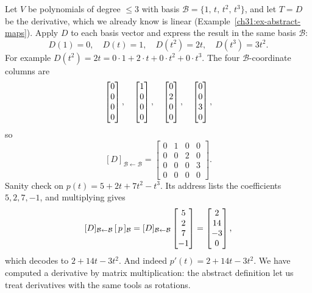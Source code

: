 \begin{example}
\label{ch31:ex-derivative-matrix}
Let $V$ be polynomials of degree $\le 3$ with basis
$\mathcal{B}=\{1,\,t,\,t^2,\,t^3\}$, and let $T=D$ be the derivative, which we
already know is linear (Example~\ref{ch31:ex-abstract-maps}). Apply $D$ to each
basis vector and express the result in the same basis $\mathcal{B}$:
\[
  D(1)=0,\quad D(t)=1,\quad D(t^2)=2t,\quad D(t^3)=3t^2.
\]
For example $D(t^2)=2t = 0\cdot 1 + 2\cdot t + 0\cdot t^2 + 0\cdot t^3$. The
four $\mathcal{B}$-coordinate columns are
\[
  \begin{bmatrix}0\\0\\0\\0\end{bmatrix},\quad\begin{bmatrix}1\\0\\0\\0\end{bmatrix},\quad\begin{bmatrix}0\\2\\0\\0\end{bmatrix},\quad\begin{bmatrix}0\\0\\3\\0\end{bmatrix},
\]
so
\[
  [D]_{\mathcal{B}\leftarrow\mathcal{B}}
  = \begin{bmatrix} 0 & 1 & 0 & 0\\ 0 & 0 & 2 & 0\\ 0 & 0 & 0 & 3\\ 0 & 0 & 0 & 0\end{bmatrix}.
\]
Sanity check on $p(t)=5 + 2t + 7t^2 - t^3$. Its address lists the coefficients
$5,2,7,-1$, and multiplying gives
\[
  [D]_{\mathcal{B}\leftarrow\mathcal{B}}\,[\,p\,]_{\mathcal{B}}
  = [D]_{\mathcal{B}\leftarrow\mathcal{B}}\begin{bmatrix}5\\2\\7\\-1\end{bmatrix}
  = \begin{bmatrix}2\\14\\-3\\0\end{bmatrix},
\]
which decodes to $2 + 14t - 3t^2$. And indeed $p'(t) = 2 + 14t - 3t^2$. We
have computed a derivative by matrix multiplication: the abstract definition
let us treat derivatives with the same tools as rotations.
\end{example}

